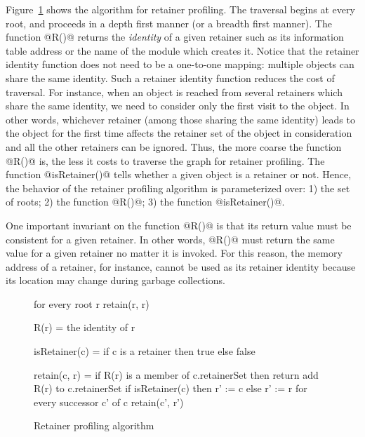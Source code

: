 \documentclass{article}
\begin{document}
Figure~\ref{fig-retaineralgorithm} shows the algorithm for retainer
profiling. The traversal begins at every root, and proceeds 
in a depth first manner (or a breadth first manner).
The function @R()@ returns the \emph{identity} of a given retainer such
as its information table address or
the name of the module which creates it.
Notice that the retainer identity function does not need to be a 
one-to-one mapping:
multiple objects can share the same identity.
Such a retainer identity function reduces the cost of traversal.
For instance, when an object
is reached from several retainers which share the same identity, we need to
consider only the first visit to the object.
In other words, whichever retainer (among those sharing the same identity) 
leads to the object for the first time affects the retainer set of the object
in consideration
and all the other retainers can be ignored.
Thus, the more coarse the function @R()@ is, the less
it costs to traverse the graph for retainer profiling.
The function @isRetainer()@ tells whether a given object is a retainer or not.
Hence, the behavior of the retainer profiling algorithm is parameterized
over: 1) the set of roots; 2) the function @R()@; 3) the function
@isRetainer()@.

One important invariant on the function @R()@ is that its return value
must be consistent for a given retainer. In other words, @R()@ must return
the same value for a given retainer no matter it is invoked.
For this reason, the memory address of a retainer, for instance, cannot be used as
its retainer identity because its location may change during garbage collections.

\begin{figure}[ht]
\begin{center}
\begin{code}
for every root r
  retain(r, r)

R(r) =
  the identity of r

isRetainer(c) =
  if c is a retainer then   
    true 
  else 
    false

retain(c, r) =
  if R(r) is a member of c.retainerSet then 
    return
  add R(r) to c.retainerSet
  if isRetainer(c) then 
    r' := c
  else 
    r' := r
  for every successor c' of c
    retain(c', r')
\end{code}
\caption{Retainer profiling algorithm}
\label{fig-retaineralgorithm}
\end{center}
\end{figure}
\end{document}
